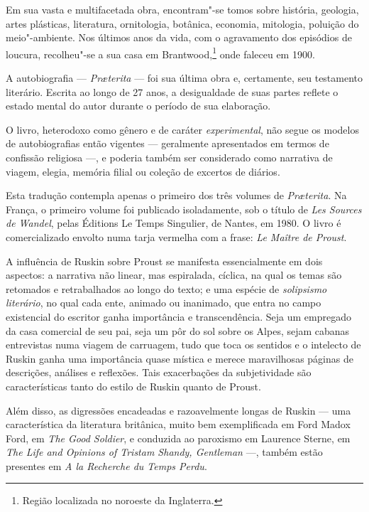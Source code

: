 Em sua vasta e multifacetada obra, encontram"-se tomos sobre história,
geologia, artes plásticas, literatura, ornitologia, botânica, economia,
mitologia, poluição do meio"-ambiente. Nos últimos anos da vida, com o
agravamento dos episódios de loucura, recolheu"-se a sua casa em
Brantwood,\footnote{Região localizada no noroeste da Inglaterra.} onde faleceu em 1900.

A autobiografia --- \textit{Pr\ae terita} --- foi sua última obra e,
certamente, seu testamento literário. Escrita ao longo de 27 anos, a
desigualdade de suas partes reflete o estado mental do autor durante o
período de sua elaboração.

O livro, heterodoxo como gênero e de caráter \textit{experimental}, não segue
os modelos de autobiografias então vigentes --- geralmente apresentados
em termos de confissão religiosa ---, e poderia também ser considerado
como narrativa de viagem, elegia, memória filial ou coleção de excertos
de diários.

Esta tradução contempla apenas o primeiro dos três volumes de
\textit{Pr\ae terita}. Na França, o primeiro volume foi publicado
isoladamente, sob o título de \textit{Les Sources de Wandel}, pelas Éditions Le
Temps Singulier, de Nantes, em 1980. O livro é comercializado envolto numa
tarja vermelha com a frase: \textit{Le Maître de Proust}.


A influência de Ruskin sobre Proust se manifesta essencialmente em dois
aspectos: a narrativa não linear, mas espiralada, cíclica, na qual os
temas são retomados e retrabalhados ao longo do texto; e uma espécie de
\textit{solipsismo literário}, no qual cada ente, animado ou inanimado, que
entra no campo existencial do escritor ganha importância e
transcendência. Seja um empregado da casa comercial de seu pai, seja um
pôr do sol sobre os Alpes, sejam cabanas entrevistas numa viagem de
carruagem, tudo que toca os sentidos e o intelecto de Ruskin ganha uma
importância quase mística e merece maravilhosas páginas de descrições,
análises e reflexões. Tais exacerbações da subjetividade são
características tanto do estilo de Ruskin quanto de Proust.

Além disso, as digressões encadeadas e razoavelmente longas de Ruskin ---
uma característica da literatura britânica, muito bem exemplificada em
Ford Madox Ford, em \textit{The Good Soldier}, e conduzida ao paroxismo em
Laurence Sterne, em \textit{The Life and Opinions of Tristam Shandy,
Gentleman} ---, também estão presentes em \textit{A la Recherche du Temps
Perdu}.


